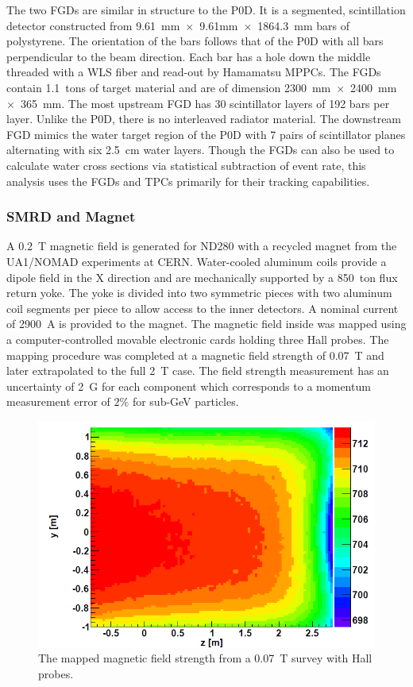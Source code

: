The two FGDs are similar in structure to the P0D. It is a segmented,
scintillation detector constructed from 9.61~mm~$\times$~9.61mm~$\times$~1864.3~mm
bars of polystyrene. The orientation of the bars follows that of the
P0D with all bars perpendicular to the beam direction. Each bar has a
hole down the middle threaded with a WLS fiber and read-out by
Hamamatsu MPPCs. The FGDs contain 1.1~tons of target material and are
of dimension 2300~mm~$\times$~2400~mm~$\times$~365~mm. The most upstream FGD has 30
scintillator layers of 192 bars per layer. Unlike the P0D, there is no
interleaved radiator material. The downstream FGD mimics the water
target region of the P0D with 7 pairs of scintillator planes
alternating with six 2.5~cm water layers. Though the FGDs can also be
used to calculate water cross sections via statistical subtraction of
event rate, this analysis uses the FGDs and TPCs primarily for their
tracking capabilities. 

\subsubsection{SMRD and Magnet}

A 0.2~T magnetic field is generated for ND280 with a recycled magnet
from the UA1/NOMAD experiments at CERN. Water-cooled aluminum coils
provide a dipole field in the X direction and are mechanically supported by a
850~ton flux return yoke. The yoke is divided into two symmetric
pieces with two aluminum coil segments per piece to allow access to
the inner detectors. A nominal current of 2900~A is provided to the
magnet. The magnetic field inside was mapped using a
computer-controlled movable electronic cards holding three Hall
probes. The mapping procedure was completed at a magnetic field
strength of 0.07~T and later extrapolated to the full 2~T case. The
field strength measurement has an uncertainty of 2~G for each component
which corresponds to a momentum measurement error of $2\%$ for sub-GeV
particles. 

\begin{figure}
\begin{center}
\includegraphics[width=6in]{./Figures/magneticfield.png}
\end{center}
\caption{The mapped magnetic field strength from a 0.07~T survey with
  Hall probes.}
\label{fig:magneticfield}
\end{figure}

